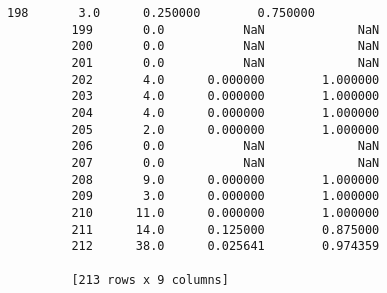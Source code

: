 \documentclass[11pt]{article}
\begin{document}
\begin{Verbatim}[commandchars=\\\{\}]
         198       3.0      0.250000        0.750000  
         199       0.0           NaN             NaN  
         200       0.0           NaN             NaN  
         201       0.0           NaN             NaN  
         202       4.0      0.000000        1.000000  
         203       4.0      0.000000        1.000000  
         204       4.0      0.000000        1.000000  
         205       2.0      0.000000        1.000000  
         206       0.0           NaN             NaN  
         207       0.0           NaN             NaN  
         208       9.0      0.000000        1.000000  
         209       3.0      0.000000        1.000000  
         210      11.0      0.000000        1.000000  
         211      14.0      0.125000        0.875000  
         212      38.0      0.025641        0.974359  
         
         [213 rows x 9 columns]
\end{Verbatim}
            
\end{document}
